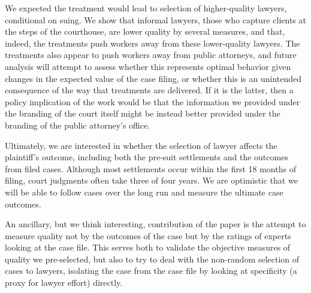 \documentclass[oneside,12pt]{article}
\begin{document}
We expected the treatment would lead to selection of higher-quality lawyers, conditional on suing. We show that informal lawyers, those who capture clients at the steps of the courthouse, are lower quality by several measures, and that, indeed, the treatments push workers away from these lower-quality lawyers. The treatments also appear to push workers away from public attorneys, and future analysis will attempt to assess whether this represents optimal behavior given changes in the expected value of the case filing, or whether this is an unintended consequence of the way that treatments are delivered. If it is the latter, then a policy implication of the work would be that the information we provided under the branding of the court itself might be instead better provided under the branding of the public attorney’s office. 

Ultimately, we are interested in whether the selection of lawyer affects the plaintiff’s outcome, including both the pre-suit settlements and the outcomes from filed cases. Although most settlements occur within the first 18 months of filing, court judgments often take three of four years. We are optimistic that we will be able to follow cases over the long run and measure the ultimate case outcomes.

An ancillary, but we think interesting, contribution of the paper is the attempt to measure quality not by the outcomes of the case but by the ratings of experts looking at the case file. This serves both to validate the objective measures of quality we pre-selected, but also to try to deal with the non-random selection of cases to lawyers, isolating the case from the case file by looking at specificity (a proxy for lawyer effort) directly.





\nocite{*}





\clearpage

\onehalfspacing









\clearpage








\clearpage
\end{document}

